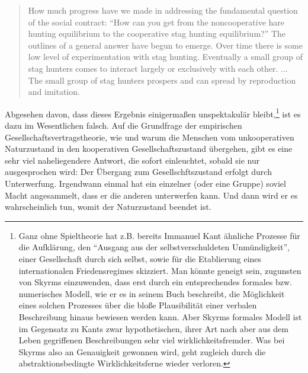 \documentclass[12pt,a4paper,ngerman]{article}
\begin{document}
\begin{quotation}

How much progress have we made in addressing the fundamental question of the
social contract: "`How can you get from the noncooperative hare hunting
equilibrium to the cooperative stag hunting equilibrium?"' The outlines of a
general answer have begun to emerge. Over time there is some low level of
experimentation with stag hunting. Eventually a small group of stag hunters
comes to interact largely or exclusively with each other. ... The small group
of stag hunters prospers and can spread by reproduction and imitation.

\end{quotation}  

Abgesehen davon, dass dieses Ergebnis einigermaßen unspektakulär
bleibt,\footnote{Ganz ohne Spieltheorie hat z.B. bereits Immanuel Kant
ähnliche Prozesse für die Aufklärung, den "`Ausgang aus der
selbstverschuldeten Unmündigkeit"', einer Gesellschaft durch sich
selbst, sowie für die Etablierung eines internationalen
Friedensregimes skizziert\cite[S. 356]{kant:1795}. Man könnte geneigt
sein, zugunsten von Skyrms einzuwenden, dass erst durch ein
entsprechendes formales bzw. numerisches Modell, wie er es in seinem
Buch beschreibt, die Möglichkeit eines solchen Prozesses über die
bloße Plausibilität einer verbalen Beschreibung hinaus bewiesen werden
kann. Aber Skyrms formales Modell ist im Gegensatz zu Kants zwar
hypothetischen, ihrer Art nach aber aus dem Leben gegriffenen
Beschreibungen sehr viel wirklichkeitsfremder. Was bei Skyrms also an
Genauigkeit gewonnen wird, geht zugleich durch die
abstraktionsbedingte Wirklichkeitsferne wieder verloren.} ist es dazu
im Wesentlichen falsch. Auf die Grundfrage der empirischen
Gesellschaftsvertragstheorie, wie und warum die Menschen vom
unkooperativen Naturzustand in den kooperativen Gesellschaftszustand
übergehen, gibt es eine sehr viel naheliegendere Antwort, die sofort
einleuchtet, sobald sie nur ausgesprochen wird: Der Übergang zum
Gesellschftszustand erfolgt durch Unterwerfung. Irgendwann einmal hat
ein einzelner (oder eine Gruppe) soviel Macht angesammelt, dass er die
anderen unterwerfen kann. Und dann wird er es wahrscheinlich tun,
womit der Naturzustand beendet ist.
\end{document}

